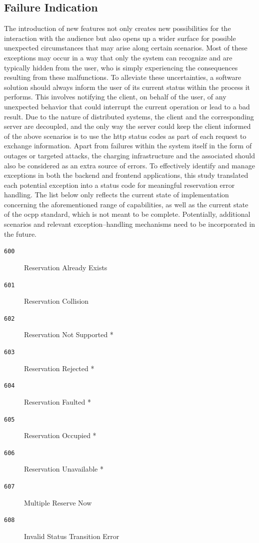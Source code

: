 \subsection{Failure Indication}
\label{ch:Implementation:sec:Reservation System:ssec:Failure Indication}

The introduction of new features not only creates new possibilities for the interaction with the audience but also opens up a wider surface for possible unexpected circumstances that may arise along certain scenarios. 
Most of these exceptions may occur in a way that only the system can recognize and are typically hidden from the user, who is simply experiencing the consequences resulting from these malfunctions.
To alleviate these uncertainties, a software solution should always inform the user of its current status within the process it performs. This involves notifying the client, on behalf of the user, of any unexpected behavior that could interrupt the current operation or lead to a bad result.
Due to the nature of distributed systems, the client and the corresponding server are decoupled, and the only way the server could keep the client informed of the above scenarios is to use the \acrshort{http} status codes as part of each request to exchange information.
Apart from failures within the system itself in the form of outages or targeted attacks, the charging infrastructure and the associated  should also be considered as an extra source of errors. 
To effectively identify and manage exceptions in both the backend and frontend applications, this study translated each potential exception into a status code for meaningful reservation error handling.
The list below only reflects the current state of implementation concerning the aforementioned range of capabilities, as well as the current state of the \acrshort{ocpp} standard, which is not meant to be complete. Potentially, additional scenarios and relevant exception--handling mechanisms need to be incorporated in the future.

\begin{multicols}{2}
\begin{description}
    \item[\texttt{600}] Reservation Already Exists
    \item[\texttt{601}] Reservation Collision
    \item[\texttt{602}] Reservation Not Supported *
    \item[\texttt{603}] Reservation Rejected *
    \item[\texttt{604}] Reservation Faulted *
\end{description}
\begin{description}
    \item[\texttt{605}] Reservation Occupied *
    \item[\texttt{606}] Reservation Unavailable *
    \item[\texttt{607}] Multiple Reserve Now
    \item[\texttt{608}] Invalid Status Transition Error
\end{description}
\end{multicols}

